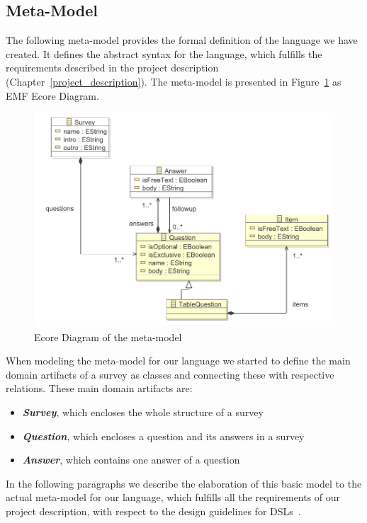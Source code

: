 \documentclass[runningheads,a4paper]{llncs}
\begin{document}
\subsection{Meta-Model}
\label{sec:meta_model}
The following meta-model provides the formal definition of the language we have created. It defines the abstract syntax for the language, which fulfills the requirements described in the project description (Chapter~\ref{project_description}). The meta-model is presented in Figure~\ref{fig:meta_model} as EMF Ecore Diagram.

\begin{figure}[htb]
	\centering
	\includegraphics[scale=0.77]{images/meta_model}
	\caption{Ecore Diagram of the meta-model}
	\label{fig:meta_model}
\end{figure}

When modeling the meta-model for our language we started to define the main domain artifacts of a survey as classes and connecting these with respective relations. These main domain artifacts are:
\begin{itemize}
	\item \textit{\textbf{Survey}}, which encloses the whole structure of a survey
	\item \textit{\textbf{Question}}, which encloses a question and its answers in a survey
	\item \textit{\textbf{Answer}}, which contains one answer of a question
\end{itemize}

In the following paragraphs we describe the elaboration of this basic model to the actual meta-model for our language, which fulfills all the requirements of our project description, with respect to the design guidelines for DSLs~\cite{karsai}. 
\end{document}
